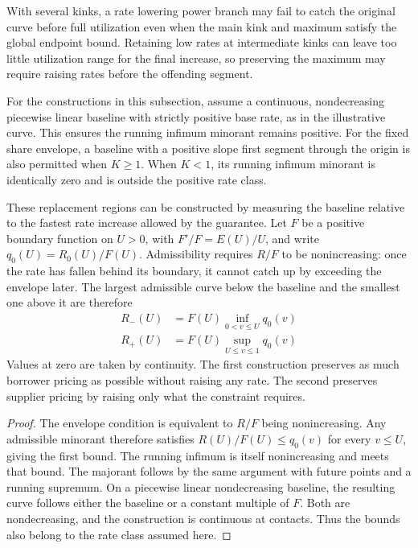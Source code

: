 \documentclass[11pt,a4paper]{article}
\begin{document}
With several kinks, a rate lowering power branch may fail to catch the original curve before full utilization even when the main kink and maximum satisfy the global endpoint bound. Retaining low rates at intermediate kinks can leave too little utilization range for the final increase, so preserving the maximum may require raising rates before the offending segment.

For the constructions in this subsection, assume a continuous, nondecreasing piecewise linear baseline with strictly positive base rate, as in the illustrative curve. This ensures the running infimum minorant remains positive. For the fixed share envelope, a baseline with a positive slope first segment through the origin is also permitted when $K\geq1$. When $K<1$, its running infimum minorant is identically zero and is outside the positive rate class.

These replacement regions can be constructed by measuring the baseline relative to the fastest rate increase allowed by the guarantee. Let $F$ be a positive boundary function on $U>0$, with $F'/F=E(U)/U$, and write $q_0(U)=R_0(U)/F(U)$. Admissibility requires $R/F$ to be nonincreasing: once the rate has fallen behind its boundary, it cannot catch up by exceeding the envelope later. The largest admissible curve below the baseline and the smallest one above it are therefore
\begin{equation}
\boxed{
\begin{aligned}
R_-(U)&=F(U)\inf_{0<v\leq U}q_0(v)\\
R_+(U)&=F(U)\sup_{U\leq v\leq1}q_0(v)
\end{aligned}
}
\end{equation}
Values at zero are taken by continuity. The first construction preserves as much borrower pricing as possible without raising any rate. The second preserves supplier pricing by raising only what the constraint requires.

\begin{proof}
The envelope condition is equivalent to $R/F$ being nonincreasing. Any admissible minorant therefore satisfies $R(U)/F(U)\leq q_0(v)$ for every $v\leq U$, giving the first bound. The running infimum is itself nonincreasing and meets that bound. The majorant follows by the same argument with future points and a running supremum. On a piecewise linear nondecreasing baseline, the resulting curve follows either the baseline or a constant multiple of $F$. Both are nondecreasing, and the construction is continuous at contacts. Thus the bounds also belong to the rate class assumed here.
\end{proof}
\end{document}
